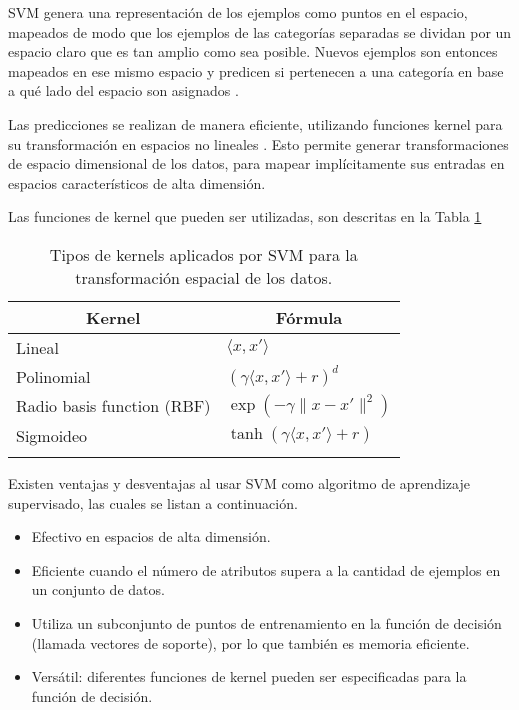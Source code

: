 SVM genera una representación de los ejemplos como puntos en el espacio, mapeados de modo que los ejemplos de las categorías separadas se dividan por un espacio claro que es tan amplio como sea posible. Nuevos ejemplos son entonces mapeados en ese mismo espacio y predicen si pertenecen a una categoría en base a qué lado del espacio son asignados \cite{scholkopf2001learning}.

Las predicciones se realizan de manera eficiente, utilizando funciones kernel para su transformación en espacios no lineales \cite{amari1999improving}. Esto permite generar transformaciones de espacio dimensional de los datos, para mapear implícitamente sus entradas en espacios característicos de alta dimensión. 

Las funciones de kernel que pueden ser utilizadas, son descritas en la Tabla \ref{tab:tab-kernel}

\begin{longtable}[c]{|l|l|}
	\hline
	\multicolumn{1}{|c|}{\textbf{Kernel}} & \multicolumn{1}{c|}{\textbf{Fórmula}}   \\ \hline
	\endfirsthead
	\endhead
	Lineal                                & $\langle x, x'\rangle$                  \\ \hline
	Polinomial                            & $(\gamma \langle x, x'\rangle + r)^d$   \\ \hline
	Radio basis function (RBF)            & $\exp(-\gamma \|x-x'\|^2)$              \\ \hline
	Sigmoideo                             & $\tanh(\gamma \langle x,x'\rangle + r)$ \\ \hline
	\caption{Tipos de kernels aplicados por SVM para la transformación espacial de los datos.
	}
	\label{tab:tab-kernel}\\
\end{longtable}

Existen ventajas y desventajas al usar SVM como algoritmo de aprendizaje supervisado, las cuales se listan a continuación.

\begin{itemize}
	
	\item Efectivo en espacios de alta dimensión.
	\item Eficiente cuando el número de atributos supera a la cantidad de ejemplos en un conjunto de datos.
	\item Utiliza un subconjunto de puntos de entrenamiento en la función de decisión (llamada
	vectores de soporte), por lo que también es memoria eficiente.
	\item Versátil: diferentes funciones de kernel pueden ser especificadas para la función de decisión. 
	
\end{itemize}

